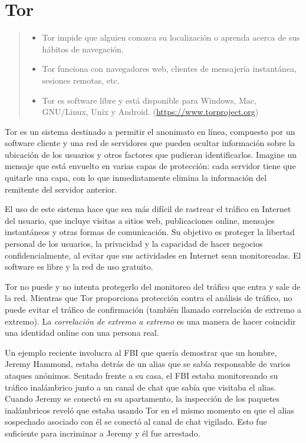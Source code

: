 \documentclass[10pt,a5paper,twoside,,]{book}
\providecommand{\tightlist}{%
  \setlength{\itemsep}{0pt}\setlength{\parskip}{0pt}}
\begin{document}
\section{Tor}\label{tor}

\begin{quote}
\begin{itemize}
\tightlist
\item
  Tor impide que alguien conozca su localización o aprenda acerca de sus
  hábitos de navegación.
\item
  Tor funciona con navegadores web, clientes de mensajería instantánea,
  sesiones remotas, etc.
\item
  Tor es software libre y está disponible para Windows, Mac, GNU/Linux,
  Unix y Android. (\url{https://www.torproject.org})
\end{itemize}
\end{quote}

Tor es un sistema destinado a permitir el anonimato en línea, compuesto
por un software cliente y una red de servidores que pueden ocultar
información sobre la ubicación de los usuarios y otros factores que
pudieran identificarlos. Imagine un mensaje que está envuelto en varias
capas de protección: cada servidor tiene que quitarle una capa, con lo
que inmediatamente elimina la información del remitente del servidor
anterior.

El uso de este sistema hace que sea más difícil de rastrear el tráfico
en Internet del usuario, que incluye visitas a sitios web, publicaciones
online, mensajes instantáneos y otras formas de comunicación. Su
objetivo es proteger la libertad personal de los usuarios, la privacidad
y la capacidad de hacer negocios confidencialmente, al evitar que sus
actividades en Internet sean monitoreadas. El software es libre y la red
de uso gratuito.

Tor no puede y no intenta protegerlo del monitoreo del tráfico que entra
y sale de la red. Mientras que Tor proporciona protección contra el
análisis de tráfico, no puede evitar el tráfico de confirmación (también
llamado correlación de extremo a extremo). La \emph{correlación de
extremo a extremo} es una manera de hacer coincidir una identidad online
con una persona real.

Un ejemplo reciente involucra al FBI que quería demostrar que un hombre,
Jeremy Hammond, estaba detrás de un alias que se sabía responsable de
varios ataques anónimos. Sentado frente a su casa, el FBI estaba
monitoreando su tráfico inalámbrico junto a un canal de chat que sabía
que visitaba el alias. Cuando Jeremy se conectó en su apartamento, la
inspección de los paquetes inalámbricos reveló que estaba usando Tor en
el mismo momento en que el alias sospechado asociado con él se conectó
al canal de chat vigilado. Esto fue suficiente para incriminar a Jeremy
y él fue arrestado.
\end{document}
